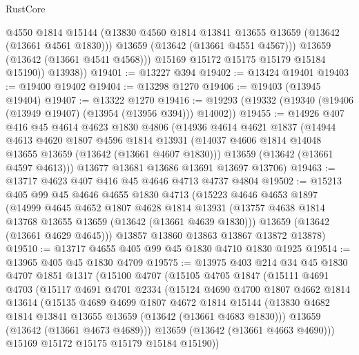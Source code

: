 \begin{lexlean}{RustCore}
\begin{coremodule}
                @4550
                @1814
                @15144
                (@13830 @4560 @1814 @13841 @13655 @13659 (@13642 (@13661 @4561 @1830)))
                @13659
                (@13642 (@13661 @4551 @4567)))
              @13659
              (@13642 (@13661 @4541 @4568)))
            @15169
            @15172
            @15175
            @15179
            @15184
            @15190))
        @13938))
@19401 := @13227 @394
@19402 := @13424 @19401
@19403 := @19400 @19402
@19404 := @13298 @1270
@19406 := @19403 (@13945 @19404)
@19407 := @13322 @1270
@19416 := @19293 (@19332 (@19340 (@19406 (@13949 @19407) (@13954 (@13956 @394))) @14002))
@19455 := @14926
    @407
    @416
    @45
    @4614
    @4623
    @1830
    @4806
    (@14936
      @4614
      @4621
      @1837
      (@14944
        @4613
        @4620
        @1807
        @4596
        @1814
        @13931
        (@14037 @4606 @1814 @14048 @13655 @13659 (@13642 (@13661 @4607 @1830)))
        @13659
        (@13642 (@13661 @4597 @4613)))
      @13677
      @13681
      @13686
      @13691
      @13697
      @13706)
@19463 := @13717 @4623 @407 @416 @45 @4646 @4713 @4737 @4804
@19502 := @15213
    @405
    @99
    @45
    @4646
    @4655
    @1830
    @4713
    (@15223
      @4646
      @4653
      @1897
      (@14999
        @4645
        @4652
        @1807
        @4628
        @1814
        @13931
        (@13757 @4638 @1814 @13768 @13655 @13659 (@13642 (@13661 @4639 @1830)))
        @13659
        (@13642 (@13661 @4629 @4645)))
      @13857
      @13860
      @13863
      @13867
      @13872
      @13878)
@19510 := @13717 @4655 @405 @99 @45 @1830 @4710 @1830 @1925
@19514 := @13965 @405 @45 @1830 @4709
@19575 := @13975
    @403
    @214
    @34
    @45
    @1830
    @4707
    @1851
    @1317
    (@15100
      @4707
      (@15105
        @4705
        @1847
        (@15111
          @4691
          @4703
          (@15117
            @4691
            @4701
            @2334
            (@15124
              @4690
              @4700
              @1807
              @4662
              @1814
              @13614
              (@15135
                @4689
                @4699
                @1807
                @4672
                @1814
                @15144
                (@13830 @4682 @1814 @13841 @13655 @13659 (@13642 (@13661 @4683 @1830)))
                @13659
                (@13642 (@13661 @4673 @4689)))
              @13659
              (@13642 (@13661 @4663 @4690)))
            @15169
            @15172
            @15175
            @15179
            @15184
            @15190))

\end{coremodule}
\end{lexlean}
